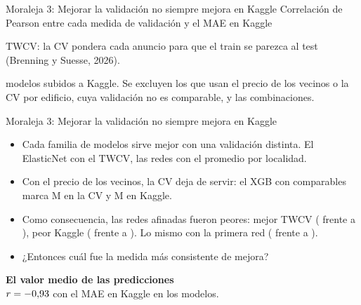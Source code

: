 \documentclass[aspectratio=169, 11pt]{beamer}
\newcommand{\tablas}{../../output/tables/03_presentacion}
\begin{document}
\begin{frame}{Moraleja 3: Mejorar la validación no siempre mejora en Kaggle}
  \centering
  {\small Correlación de Pearson entre cada medida de validación y el MAE en Kaggle}\\[.8em]
  \footnotesize

  \vspace{.8em}
  {\footnotesize TWCV: la CV pondera cada anuncio para que el train se parezca al test (Brenning y Suesse, 2026).}

  \vfill
  \raggedright
  {\scriptsize\color{secundario} \nModTabla{} modelos subidos a Kaggle. Se excluyen los que usan el precio de los vecinos o la CV por edificio, cuya validación no es comparable, y las combinaciones.}
\end{frame}

\begin{frame}{Moraleja 3: Mejorar la validación no siempre mejora en Kaggle}
  \small
  \begin{itemize}\setlength{\itemsep}{10pt}
    \item Cada familia de modelos sirve mejor con una validación distinta. El ElasticNet con el TWCV, las redes con el promedio por localidad.
    \item Con el precio de los vecinos, la CV deja de servir: el XGB con comparables marca \cvXGBcomp{} M en la CV y \kXGBcomp{} M en Kaggle.
    \item Como consecuencia, las redes afinadas fueron peores: mejor TWCV (\twAfinada{} frente a \twBase), peor Kaggle (\kAfinada{} frente a \kBase). Lo mismo con la primera red (\kAfinadaUno{} frente a \kBaseUno).
    \item ¿Entonces cuál fue la medida más consistente de mejora?
  \end{itemize}
  \pause
  \vspace{.6em}
  \begin{center}
    \textbf{El valor medio de las predicciones}\\[.3em]
    {\footnotesize $r = -0{,}93$ con el MAE en Kaggle en los \nModKaggle{} modelos.}
  \end{center}
\end{frame}
\end{document}
